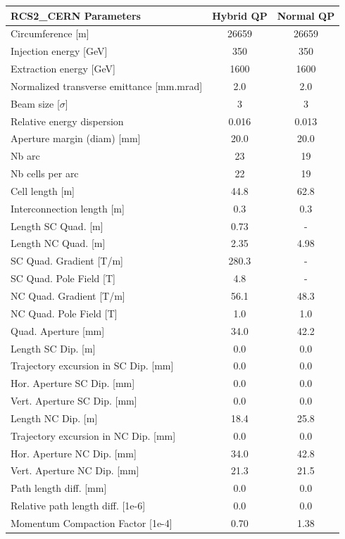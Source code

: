 \begin{tabular}{lcc}
\toprule
RCS2_CERN Parameters & Hybrid QP & Normal QP \\
\midrule
Circumference [m] & 26659 & 26659 \\
Injection energy [GeV] & 350 & 350 \\
Extraction energy [GeV] & 1600 & 1600 \\
Normalized transverse emittance [mm.mrad] & 2.0 & 2.0 \\
Beam size [$\sigma$] & 3 & 3 \\
Relative energy dispersion & 0.016 & 0.013 \\
Aperture margin (diam) [mm] & 20.0 & 20.0 \\
Nb arc & 23 & 19 \\
Nb cells per arc & 22 & 19 \\
Cell length [m] & 44.8 & 62.8 \\
Interconnection length [m] & 0.3 & 0.3 \\
Length SC Quad. [m] & 0.73 & - \\
Length NC Quad. [m] & 2.35 & 4.98 \\
SC Quad. Gradient [T/m] & 280.3 & - \\
SC Quad. Pole Field [T] & 4.8 & - \\
NC Quad. Gradient [T/m] & 56.1 & 48.3 \\
NC Quad. Pole Field [T] & 1.0 & 1.0 \\
Quad. Aperture [mm] & 34.0 & 42.2 \\
Length SC Dip. [m] & 0.0 & 0.0 \\
Trajectory excursion in SC Dip. [mm] & 0.0 & 0.0 \\
Hor. Aperture SC Dip. [mm] & 0.0 & 0.0 \\
Vert. Aperture SC Dip. [mm] & 0.0 & 0.0 \\
Length NC Dip. [m] & 18.4 & 25.8 \\
Trajectory excursion in NC Dip. [mm] & 0.0 & 0.0 \\
Hor. Aperture NC Dip. [mm] & 34.0 & 42.8 \\
Vert. Aperture NC Dip. [mm] & 21.3 & 21.5 \\
Path length diff. [mm] & 0.0 & 0.0 \\
Relative path length diff. [1e-6] & 0.0 & 0.0 \\
Momentum Compaction Factor [1e-4] & 0.70 & 1.38 \\
\bottomrule
\end{tabular}
